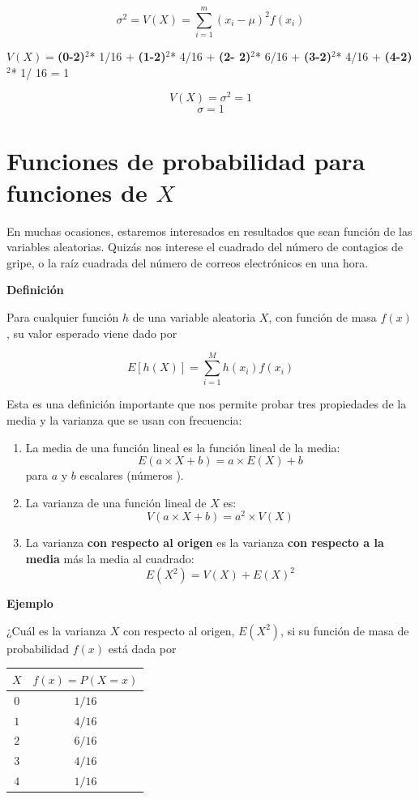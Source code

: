 \documentclass[
]{book}
\begin{document}
\[\sigma^2 =V(X)=\sum_{i=1}^m (x_i-\mu)^2 f(x_i)\]

\(V(X)=\)\textbf{(0-2)}\(^2\)* 1/16 + \textbf{(1-2)}\(^2\)* 4/16 + \textbf{(2- 2)}\(^2\)* 6/16 + \textbf{(3-2)}\(^2\)* 4/16 + \textbf{(4-2)}\(^2\)* 1/ 16 = 1

\[V(X)=\sigma^2=1\]
\[\sigma=1\]

\hypertarget{funciones-de-probabilidad-para-funciones-de-x}{%
\section{\texorpdfstring{Funciones de probabilidad para funciones de \(X\)}{Funciones de probabilidad para funciones de X}}\label{funciones-de-probabilidad-para-funciones-de-x}}

En muchas ocasiones, estaremos interesados en resultados que sean función de las variables aleatorias. Quizás nos interese el cuadrado del número de contagios de gripe, o la raíz cuadrada del número de correos electrónicos en una hora.

\textbf{Definición}

Para cualquier función \(h\) de una variable aleatoria \(X\), con función de masa \(f(x)\), su valor esperado viene dado por

\[ E[h(X)]= \sum_{i=1}^M h(x_i) f(x_i) \]

Esta es una definición importante que nos permite probar tres propiedades de la media y la varianza que se usan con frecuencia:

\begin{enumerate}
\def\labelenumi{\arabic{enumi})}
\item
  La media de una función lineal es la función lineal de la media: \[E(a\times X +b)= a\times E(X) +b\] para \(a\) y \(b\) escalares (números ).
\item
  La varianza de una función lineal de \(X\) es:\[V(a\times X +b)= a^2\times V(X)\]
\item
  La varianza \textbf{con respecto al origen} es la varianza \textbf{con respecto a la media} más la media al cuadrado: \[E(X^2)=V(X)+E(X)^2\]
\end{enumerate}

\textbf{Ejemplo}

¿Cuál es la varianza \(X\) con respecto al origen, \(E(X^2)\), si su función de masa de probabilidad \(f(x)\) está dada por

\begin{longtable}[]{@{}cc@{}}
\toprule\noalign{}
\(X\) & \(f(x)=P(X=x)\) \\
\midrule\noalign{}
\endhead
\bottomrule\noalign{}
\endlastfoot
\(0\) & \(1/16\) \\
\(1\) & \(4/16\) \\
\(2\) & \(6/16\) \\
\(3\) & \(4/16\) \\
\(4\) & \(1/16\) \\
\end{longtable}
\end{document}
